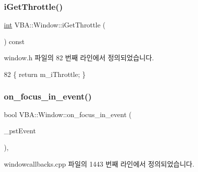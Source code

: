 \subsubsection{\texorpdfstring{i\+Get\+Throttle()}{iGetThrottle()}}
{\footnotesize\ttfamily \mbox{\hyperlink{_util_8cpp_a0ef32aa8672df19503a49fab2d0c8071}{int}} V\+B\+A\+::\+Window\+::i\+Get\+Throttle (\begin{DoxyParamCaption}{ }\end{DoxyParamCaption}) const\hspace{0.3cm}{\ttfamily [inline]}}



window.\+h 파일의 82 번째 라인에서 정의되었습니다.


\begin{DoxyCode}
82 \{ \textcolor{keywordflow}{return} m\_iThrottle; \}
\end{DoxyCode}
\mbox{\label{class_v_b_a_1_1_window_a12b2428d319af7010bbc689193f1b801}} 
\subsubsection{\texorpdfstring{on\+\_\+focus\+\_\+in\+\_\+event()}{on\_focus\_in\_event()}}
{\footnotesize\ttfamily bool V\+B\+A\+::\+Window\+::on\+\_\+focus\+\_\+in\+\_\+event (\begin{DoxyParamCaption}\item[{Gdk\+Event\+Focus $\ast$}]{\+\_\+pst\+Event }\end{DoxyParamCaption})\hspace{0.3cm}{\ttfamily [protected]}, {\ttfamily [virtual]}}



windowcallbacks.\+cpp 파일의 1443 번째 라인에서 정의되었습니다.


